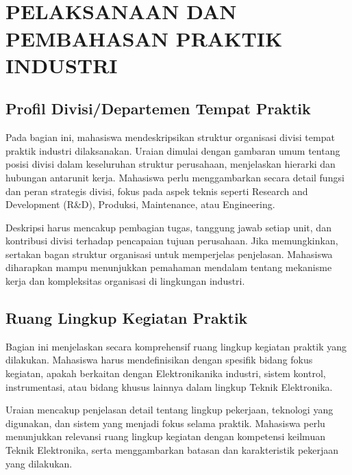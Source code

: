 
\chapter[PELAKSANAAN DAN PEMBAHASAN PRAKTIK INDUSTRI]{\\ PELAKSANAAN DAN PEMBAHASAN PRAKTIK INDUSTRI}

\section{Profil Divisi/Departemen Tempat Praktik}
Pada bagian ini, mahasiswa mendeskripsikan struktur organisasi divisi tempat praktik industri dilaksanakan. Uraian dimulai dengan gambaran umum tentang posisi divisi dalam keseluruhan struktur perusahaan, menjelaskan hierarki dan hubungan antarunit kerja. Mahasiswa perlu menggambarkan secara detail fungsi dan peran strategis divisi, fokus pada aspek teknis seperti Research and Development (R\&D), Produksi, Maintenance, atau Engineering.

Deskripsi harus mencakup pembagian tugas, tanggung jawab setiap unit, dan kontribusi divisi terhadap pencapaian tujuan perusahaan. Jika memungkinkan, sertakan bagan struktur organisasi untuk memperjelas penjelasan. Mahasiswa diharapkan mampu menunjukkan pemahaman mendalam tentang mekanisme kerja dan kompleksitas organisasi di lingkungan industri.

\section{Ruang Lingkup Kegiatan Praktik}
Bagian ini menjelaskan secara komprehensif ruang lingkup kegiatan praktik yang dilakukan. Mahasiswa harus mendefinisikan dengan spesifik bidang fokus kegiatan, apakah berkaitan dengan Elektronikanika industri, sistem kontrol, instrumentasi, atau bidang khusus lainnya dalam lingkup Teknik Elektronika.

Uraian mencakup penjelasan detail tentang lingkup pekerjaan, teknologi yang digunakan, dan sistem yang menjadi fokus selama praktik. Mahasiswa perlu menunjukkan relevansi ruang lingkup kegiatan dengan kompetensi keilmuan Teknik Elektronika, serta menggambarkan batasan dan karakteristik pekerjaan yang dilakukan.

